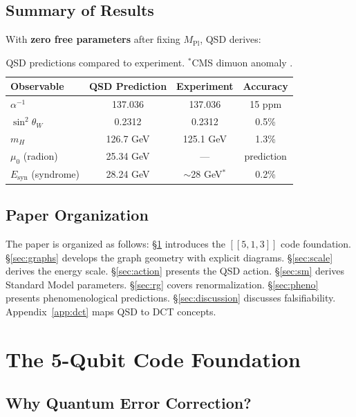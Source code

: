 \documentclass[11pt,a4paper]{article}
\theoremstyle{definition}
\newcommand{\murad}{\mu_0}              %
\newcommand{\Esyn}{E_{\text{syn}}}      %
\newcommand{\Mpl}{M_{\text{Pl}}}        %
\newcommand{\mH}{m_H}                   %
\begin{document}
\subsection{Summary of Results}

With \textbf{zero free parameters} after fixing $\Mpl$, QSD derives:

\begin{table}[h]
\centering
\begin{tabular}{lccc}
\toprule
\textbf{Observable} & \textbf{QSD Prediction} & \textbf{Experiment} & \textbf{Accuracy} \\
\midrule
$\alpha^{-1}$ & 137.036 & 137.036 & 15 ppm \\
$\sin^2\theta_W$ & 0.2312 & 0.2312 & 0.5\% \\
$\mH$ & 126.7 GeV & 125.1 GeV & 1.3\% \\
$\murad$ (radion) & 25.34 GeV & --- & prediction \\
$\Esyn$ (syndrome) & 28.24 GeV & $\sim$28 GeV$^*$ & 0.2\% \\
\bottomrule
\end{tabular}
\caption{QSD predictions compared to experiment. $^*$CMS dimuon anomaly \cite{CMS2018dimuon}.}
\label{tab:summary}
\end{table}

\subsection{Paper Organization}

The paper is organized as follows: \S\ref{sec:code} introduces the $[[5,1,3]]$ code foundation. \S\ref{sec:graphs} develops the graph geometry with explicit diagrams. \S\ref{sec:scale} derives the energy scale. \S\ref{sec:action} presents the QSD action. \S\ref{sec:sm} derives Standard Model parameters. \S\ref{sec:rg} covers renormalization. \S\ref{sec:pheno} presents phenomenological predictions. \S\ref{sec:discussion} discusses falsifiability. Appendix~\ref{app:dct} maps QSD to DCT concepts.

\section{The 5-Qubit Code Foundation}
\label{sec:code}

\subsection{Why Quantum Error Correction?}
\end{document}
